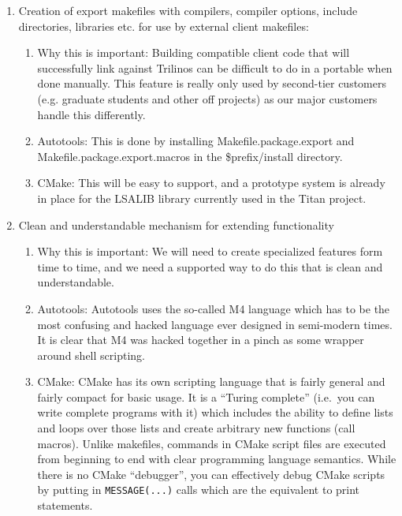 \documentclass[pdf,ps2pdf,11pt]{SANDreport}
\begin{document}
\begin{enumerate}
{}\item Creation of export makefiles with compilers, compiler options,
include directories, libraries etc. for use by external client
makefiles:

  \begin{enumerate}

  {}\item Why this is important: Building compatible client code
  that will successfully link against Trilinos can be difficult to
  do in a portable when done manually.  This feature is really only used
  by second-tier customers (e.g. graduate students and other off
  projects) as our major customers handle this differently.

  {}\item Autotools: This is done by installing
  Makefile.package.export and Makefile.package.export.macros in the
  \$prefix/install directory.

  {}\item CMake: This will be easy to support, and a prototype system
  is already in place for the LSALIB library currently used in the
  Titan project.

  \end{enumerate}

{}\item Clean and understandable mechanism for extending
functionality

  \begin{enumerate}

  {}\item Why this is important: We will need to create specialized
  features form time to time, and we need a supported way to do this
  that is clean and understandable.

  {}\item Autotools: Autotools uses the so-called M4 language which
  has to be the most confusing and hacked language ever designed in
  semi-modern times.  It is clear that M4 was hacked together in a
  pinch as some wrapper around shell scripting.

  {}\item CMake: CMake has its own scripting language that is fairly
  general and fairly compact for basic usage.  It is a ``Turing
  complete'' (i.e.\ you can write complete programs with it) which
  includes the ability to define lists and loops over those lists and
  create arbitrary new functions (call macros).  Unlike makefiles,
  commands in CMake script files are executed from beginning to end
  with clear programming language semantics.  While there is no CMake
  ``debugger'', you can effectively debug CMake scripts by putting in
  \texttt{MESSAGE(...)} calls which are the equivalent to print statements.


\end{enumerate}
\end{enumerate}
\end{document}
